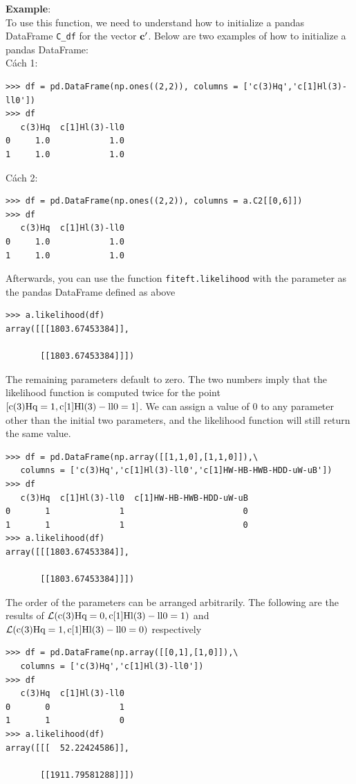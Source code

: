 \documentclass[12pt]{article}
\def\b#1{\boldsymbol{\rm #1}}
\begin{document}
 \textbf{Example}:\\
 To use this function, we need to understand how to initialize a pandas DataFrame \verb|C_df| for the vector $\b c'$.  Below are two examples of how to initialize a pandas DataFrame:\\
 Cách 1:
 \begin{verbatim}
>>> df = pd.DataFrame(np.ones((2,2)), columns = ['c(3)Hq','c[1]Hl(3)-ll0'])
>>> df
   c(3)Hq  c[1]Hl(3)-ll0
0     1.0            1.0
1     1.0            1.0
 \end{verbatim}
 Cách 2:
\begin{verbatim}
>>> df = pd.DataFrame(np.ones((2,2)), columns = a.C2[[0,6]])
>>> df
   c(3)Hq  c[1]Hl(3)-ll0
0     1.0            1.0
1     1.0            1.0
\end{verbatim}
Afterwards, you can use the function \verb|fiteft.likelihood| with the parameter as the pandas DataFrame defined as above
\begin{verbatim}
>>> a.likelihood(df)
array([[[1803.67453384]],

       [[1803.67453384]]])
\end{verbatim}
The remaining parameters default to zero. The two numbers imply that the likelihood function is computed twice for the point $[\rm c(3)Hq=1, c[1]Hl(3)-ll0=1]$.
We can assign a value of 0 to any parameter other than the initial two parameters, and the likelihood function will still return the same value.
\begin{verbatim}
>>> df = pd.DataFrame(np.array([[1,1,0],[1,1,0]]),\
   columns = ['c(3)Hq','c[1]Hl(3)-ll0','c[1]HW-HB-HWB-HDD-uW-uB'])
>>> df
   c(3)Hq  c[1]Hl(3)-ll0  c[1]HW-HB-HWB-HDD-uW-uB
0       1              1                        0
1       1              1                        0
>>> a.likelihood(df)
array([[[1803.67453384]],

       [[1803.67453384]]])
\end{verbatim}
The order of the parameters can be arranged arbitrarily. The following are the results of $\mathcal{L}(\rm c(3)Hq=0,c[1]Hl(3)-ll0=1)$ and $\mathcal{L}(\rm c(3)Hq=1,c[1]Hl(3)-ll0=0)$ respectively
\begin{verbatim}
>>> df = pd.DataFrame(np.array([[0,1],[1,0]]),\
   columns = ['c(3)Hq','c[1]Hl(3)-ll0'])
>>> df
   c(3)Hq  c[1]Hl(3)-ll0
0       0              1
1       1              0
>>> a.likelihood(df)
array([[[  52.22424586]],

       [[1911.79581288]]])
\end{verbatim}
\end{document}
